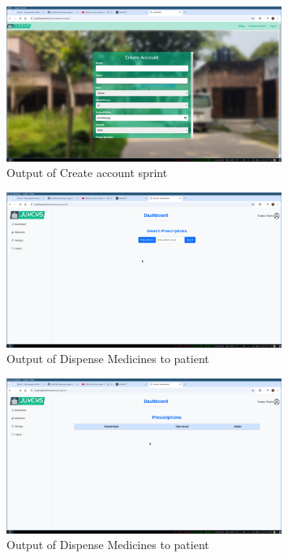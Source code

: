 \documentclass[a4paper,12pt]{article}
\begin{document}
\begin{figure}[H]
    \centering
    \includegraphics[width=0.8\textwidth]{images/spr1output2.png}
    \caption{Output of Create account sprint}
    \label{fig:sp1out1}
\end{figure}


\begin{figure}[H]
    \centering
    \includegraphics[width=0.8\textwidth]{images/spr1output3.png}
    \caption{Output of Dispense Medicines to patient}
    \label{fig:sp1out2}
\end{figure}

\begin{figure}[H]
    \centering
    \includegraphics[width=0.8\textwidth]{images/spr1output4.png}
    \caption{Output of Dispense Medicines to patient}
    \label{fig:sp1out3}
\end{figure}
\end{document}
